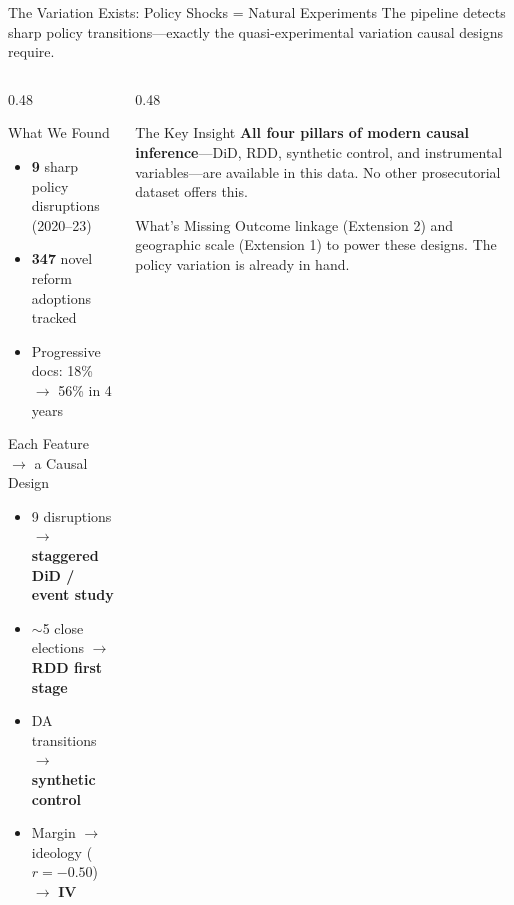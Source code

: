 \documentclass[aspectratio=169, 11pt]{beamer}
\begin{document}
\begin{frame}{The Variation Exists: Policy Shocks = Natural Experiments}
{\small The pipeline detects sharp policy transitions---exactly the quasi-experimental variation causal designs require.}
\vspace{6pt}
\begin{columns}[T]
\begin{column}{0.48\textwidth}
\begin{block}{What We Found}
\begin{itemize}\setlength\itemsep{2pt}
    \item \textbf{9} sharp policy disruptions (2020--23)
    \item \textbf{347} novel reform adoptions tracked
    \item Progressive docs: 18\% $\to$ 56\% in 4 years
\end{itemize}
\end{block}
\vspace{4pt}
\begin{block}{Each Feature $\to$ a Causal Design}
\begin{itemize}\setlength\itemsep{2pt}
    \item 9 disruptions $\to$ \textbf{staggered DiD / event study}
    \item $\sim$5 close elections $\to$ \textbf{RDD first stage}
    \item DA transitions $\to$ \textbf{synthetic control}
    \item Margin $\to$ ideology ($r = -0.50$) $\to$ \textbf{IV}
\end{itemize}
\end{block}
\end{column}
\begin{column}{0.48\textwidth}
\begin{alertblock}{The Key Insight}
\textbf{All four pillars of modern causal inference}---DiD, RDD, synthetic control, and instrumental variables---are available in this data. No other prosecutorial dataset offers this.
\end{alertblock}
\vspace{4pt}
\begin{exampleblock}{What's Missing}
Outcome linkage (Extension 2) and geographic scale (Extension 1) to power these designs. The policy variation is already in hand.
\end{exampleblock}
\end{column}
\end{columns}
\end{frame}
\end{document}
